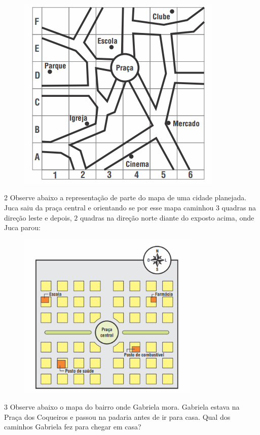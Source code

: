 \begin{figure}
\includegraphics[width=3.86042in,height=3.68611in]{./imgSAEB_6_MAT/media/image64.png}
\end{figure}


\num{2}  Observe abaixo a representação de parte do mapa de uma cidade
planejada. Juca saiu da praça central e orientando se por esse mapa caminhou $3$
quadras na direção leste e depois, $2$ quadras na direção norte diante do
exposto acima, onde Juca parou:

\begin{figure}
\includegraphics[width=3.39535in,height=3.14326in]{./imgSAEB_6_MAT/media/image65.png}
\end{figure}


\num{3}  Observe abaixo o mapa do bairro onde Gabriela mora. Gabriela estava na Praça dos Coqueiros e passou na padaria antes de ir
para casa. Qual dos caminhos Gabriela fez para chegar em casa?


